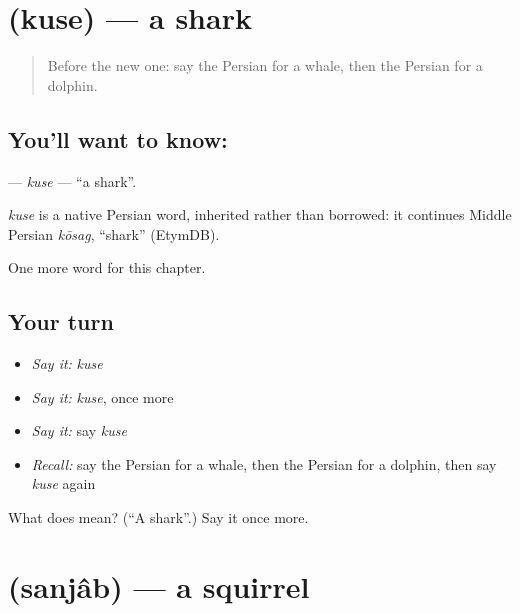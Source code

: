 \section[\texorpdfstring{\fa{کوسه} (kuse)}{کوسه (kuse)}]{ (kuse) — a shark}

\label{lesson:FA-C122-kuse}



\begin{quote}
Before the new one: say the Persian for a whale, then the Persian for a dolphin.
\end{quote}

\subsection*{You'll want to know: }
\textbf{} — \emph{kuse} — \textquotedblleft{}a shark\textquotedblright{}.

\begin{cousinweb}
\emph{kuse} is a native Persian word, inherited rather than borrowed: it continues Middle Persian \emph{kōsag}, \textquotedblleft{}shark\textquotedblright{} (EtymDB).
\end{cousinweb}

\begin{grammarlens}[title={What you've built}]
One more word for this chapter.
\end{grammarlens}

\subsection*{Your turn}
\begin{itemize}
\raggedright
  \item \emph{Say it:} \emph{kuse}
  \item \emph{Say it:} \emph{kuse}, once more
  \item \emph{Say it:} say \emph{kuse}
  \item \emph{Recall:} say the Persian for a whale, then the Persian for a dolphin, then say \emph{kuse} again
\end{itemize}

\begin{tcolorbox}[breakable,colback=teal!4,colframe=teal!35!black,title={Before you move on}]
What does  mean? (\textquotedblleft{}A shark\textquotedblright{}.) Say it once more.
\end{tcolorbox}
\section[\texorpdfstring{\fa{سنجاب} (sanjâb)}{سنجاب (sanjâb)}]{ (sanjâb) — a squirrel}

